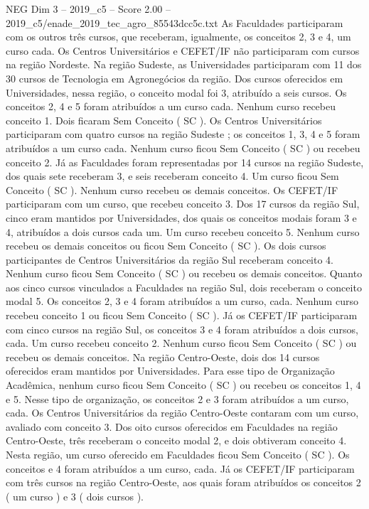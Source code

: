 \begin{textsample}{NEG Dim 3 – 2019\_c5 – Score 2.00 – 2019\_c5/enade\_2019\_tec\_agro\_85543dcc5c.txt}
As Faculdades participaram com os outros três cursos, que receberam, igualmente, os conceitos 2, 3 e 4, um curso cada.
Os Centros Universitários e CEFET/IF não participaram com cursos na região Nordeste.
Na região Sudeste, as Universidades participaram com 11 dos 30 cursos de Tecnologia em Agronegócios da região.
Dos cursos oferecidos em Universidades, nessa região, o conceito modal foi 3, atribuído a seis cursos.
Os conceitos 2, 4 e 5 foram atribuídos a um curso cada.
Nenhum curso recebeu conceito 1.
Dois ficaram Sem Conceito ( SC ).
Os Centros Universitários participaram com quatro cursos na região Sudeste ; os conceitos 1, 3, 4 e 5 foram atribuídos a um curso cada.
Nenhum curso ficou Sem Conceito ( SC ) ou recebeu conceito 2.
Já as Faculdades foram representadas por 14 cursos na região Sudeste, dos quais sete receberam 3, e seis receberam conceito 4.
Um curso ficou Sem Conceito ( SC ).
Nenhum curso recebeu os demais conceitos.
Os CEFET/IF participaram com um curso, que recebeu conceito 3.
Dos 17 cursos da região Sul, cinco eram mantidos por Universidades, dos quais os conceitos modais foram 3 e 4, atribuídos a dois cursos cada um.
Um curso recebeu conceito 5.
Nenhum curso recebeu os demais conceitos ou ficou Sem Conceito ( SC ).
Os dois cursos participantes de Centros Universitários da região Sul receberam conceito 4.
Nenhum curso ficou Sem Conceito ( SC ) ou recebeu os demais conceitos.
Quanto aos cinco cursos vinculados a Faculdades na região Sul, dois receberam o conceito modal 5.
Os conceitos 2, 3 e 4 foram atribuídos a um curso, cada.
Nenhum curso recebeu conceito 1 ou ficou Sem Conceito ( SC ).
Já os CEFET/IF participaram com cinco cursos na região Sul, os conceitos 3 e 4 foram atribuídos a dois cursos, cada.
Um curso recebeu conceito 2.
Nenhum curso ficou Sem Conceito ( SC ) ou recebeu os demais conceitos.
Na região Centro-Oeste, dois dos 14 cursos oferecidos eram mantidos por Universidades.
Para esse tipo de Organização Acadêmica, nenhum curso ficou Sem Conceito ( SC ) ou recebeu os conceitos 1, 4 e 5.
Nesse tipo de organização, os conceitos 2 e 3 foram atribuídos a um curso, cada.
Os Centros Universitários da região Centro-Oeste contaram com um curso, avaliado com conceito 3.
Dos oito cursos oferecidos em Faculdades na região Centro-Oeste, três receberam o conceito modal 2, e dois obtiveram conceito 4.
Nesta região, um curso oferecido em Faculdades ficou Sem Conceito ( SC ).
Os conceitos e 4 foram atribuídos a um curso, cada.
Já os CEFET/IF participaram com três cursos na região Centro-Oeste, aos quais foram atribuídos os conceitos 2 ( um curso ) e 3 ( dois cursos ).

\end{textsample}
